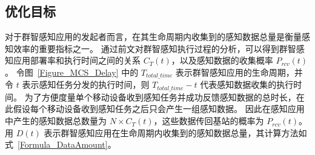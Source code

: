 





\subsection{优化目标}

对于群智感知应用的发起者而言，在其生命周期内收集到的感知数据总量是衡量感知效率的重要指标之一。
通过前文对群智感知执行过程的分析，可以得到群智感知应用部署率和执行时间之间的关系 $C_T(t)$，以及感知数据的收集概率 $P_{rcv}(t)$。
令图~\ref{Figure_MCS_Delay} 中的 $T_{total\_time}$ 表示群智感知应用的生命周期，并令 $t$ 表示感知任务分发的执行时间，则 $T_{total\_time} - t$ 代表感知数据收集的执行时间。
为了方便度量单个移动设备收到感知任务并成功反馈感知数据的总时长，在此假设每个移动设备收到感知任务之后只会产生一组感知数据。
因此在感知应用中产生的感知数据总数量为 $N \times C_T(t)$，这些数据传回基站的概率为 $P_{rcv}(t)$。
用 $D(t)$ 表示群智感知应用在生命周期内收集到的感知数据总量，其计算方法如式~\eqref{Formula_DataAmount}。

